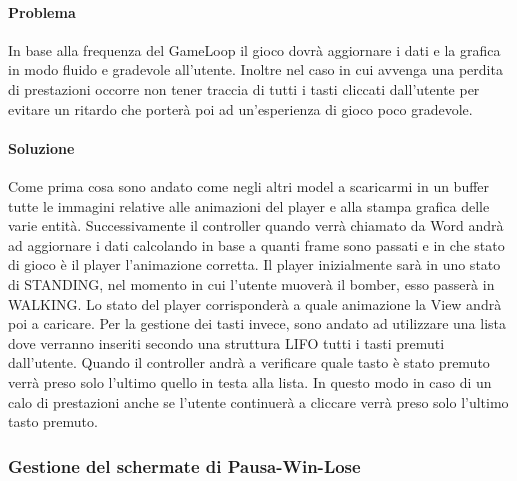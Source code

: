 \documentclass[a4paper,12pt]{report}
\begin{document}
\paragraph{Problema} In base alla frequenza del GameLoop il gioco dovrà aggiornare i dati e la grafica in modo fluido e gradevole all’utente. Inoltre nel caso in cui avvenga una perdita di prestazioni occorre non tener traccia di tutti i tasti cliccati dall’utente per evitare un ritardo che porterà poi ad un'esperienza di gioco poco gradevole.

\paragraph{Soluzione} Come prima cosa sono andato come negli altri model a scaricarmi in un buffer tutte le immagini relative alle animazioni del player e alla stampa grafica delle varie entità. Successivamente il controller quando verrà chiamato da Word andrà ad aggiornare i dati calcolando in base a quanti frame sono passati e in che stato di gioco è il player l'animazione corretta. Il player inizialmente sarà in uno stato di STANDING, nel momento in cui l'utente muoverà il bomber, esso passerà in WALKING. Lo stato del player corrisponderà a quale animazione la View andrà poi a caricare. Per la gestione dei tasti invece, sono andato ad utilizzare una lista dove verranno inseriti secondo una struttura LIFO tutti i tasti premuti dall’utente. Quando il controller andrà a verificare quale tasto è stato premuto verrà preso solo l’ultimo quello in testa alla lista. In questo modo in caso di un calo di prestazioni anche se l’utente continuerà a cliccare verrà preso solo l'ultimo tasto premuto.

\subsubsection{Gestione del schermate di Pausa-Win-Lose}
\end{document}

